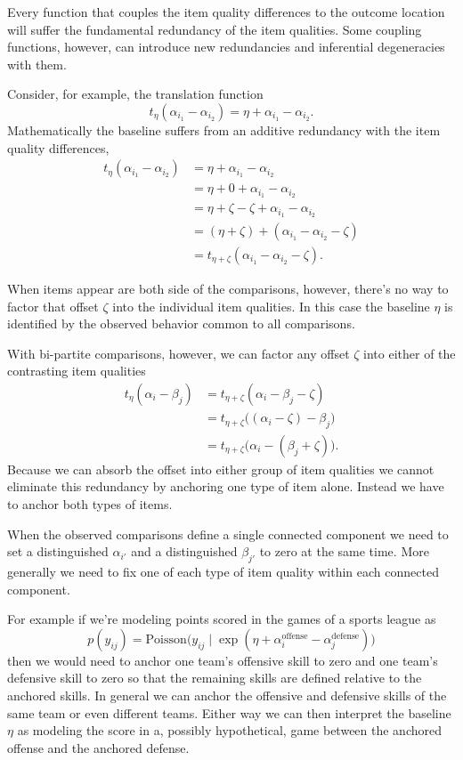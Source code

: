 \documentclass[
  letterpaper,
  DIV=11,
  numbers=noendperiod]{scrartcl}
\begin{document}
Every function that couples the item quality differences to the outcome
location will suffer the fundamental redundancy of the item qualities.
Some coupling functions, however, can introduce new redundancies and
inferential degeneracies with them.

Consider, for example, the translation function \[
t_{\eta} ( \alpha_{i_{1}} - \alpha_{i_{2}} )
=
\eta + \alpha_{i_{1}} - \alpha_{i_{2}}.
\] Mathematically the baseline suffers from an additive redundancy with
the item quality differences, \begin{align*}
t_{\eta} ( \alpha_{i_{1}} - \alpha_{i_{2}} )
&=
\eta + \alpha_{i_{1}} - \alpha_{i_{2}}
\\
&=
\eta + 0 + \alpha_{i_{1}} - \alpha_{i_{2}}
\\
&=
\eta + \zeta - \zeta + \alpha_{i_{1}} - \alpha_{i_{2}}
\\
&=
(\eta + \zeta) + (\alpha_{i_{1}} - \alpha_{i_{2}} - \zeta)
\\
&=
t_{\eta + \zeta} (\alpha_{i_{1}} - \alpha_{i_{2}} - \zeta ).
\end{align*}

When items appear are both side of the comparisons, however, there's no
way to factor that offset \(\zeta\) into the individual item qualities.
In this case the baseline \(\eta\) is identified by the observed
behavior common to all comparisons.

With bi-partite comparisons, however, we can factor any offset \(\zeta\)
into either of the contrasting item qualities \begin{align*}
t_{\eta} ( \alpha_{i} - \beta_{j} )
&=
t_{\eta + \zeta} ( \alpha_{i} - \beta_{j} - \zeta )
\\
&=
t_{\eta + \zeta} \big( (\alpha_{i} - \zeta) - \beta_{j} \big)
\\
&=
t_{\eta + \zeta} \big( \alpha_{i} - (\beta_{j} + \zeta) \big).
\end{align*} Because we can absorb the offset into either group of item
qualities we cannot eliminate this redundancy by anchoring one type of
item alone. Instead we have to anchor both types of items.

When the observed comparisons define a single connected component we
need to set a distinguished \(\alpha_{i'}\) and a distinguished
\(\beta_{j'}\) to zero at the same time. More generally we need to fix
one of each type of item quality within each connected component.

For example if we're modeling points scored in the games of a sports
league as \[
p(y_{ij} ) =
\mathrm{Poisson}\big( y_{ij} \mid
                      \exp(  \eta
                           + \alpha_{i}^{\mathrm{offense}}
                           - \alpha_{j}^{\mathrm{defense}}
                          )
                \big)
\] then we would need to anchor one team's offensive skill to zero and
one team's defensive skill to zero so that the remaining skills are
defined relative to the anchored skills. In general we can anchor the
offensive and defensive skills of the same team or even different teams.
Either way we can then interpret the baseline \(\eta\) as modeling the
score in a, possibly hypothetical, game between the anchored offense and
the anchored defense.
\end{document}
